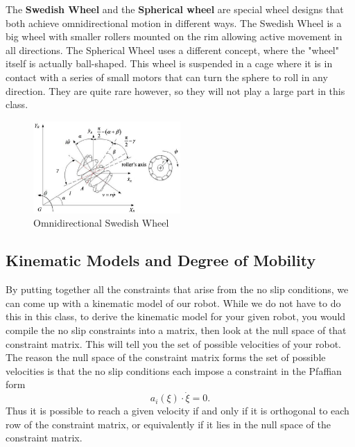\documentclass[twoside]{article}
\begin{document}
The \textbf{Swedish Wheel} and the \textbf{Spherical wheel} are special wheel designs that both achieve omnidirectional motion in different ways. The Swedish Wheel is a big wheel with smaller rollers mounted on the rim allowing active movement in all directions\cite{sns}. The Spherical Wheel uses a different concept, where the "wheel" itself is actually ball-shaped. This wheel is suspended in a cage where it is in contact with a series of small motors that can turn the sphere to roll in any direction. They are quite rare however, so they will not play a large part in this class.

\begin{figure}[H]
\centering
\includegraphics[width=0.5\textwidth]{swedish}
\caption{Omnidirectional Swedish Wheel \cite{swed}}
\end{figure}

\subsection*{Kinematic Models and Degree of Mobility}

By putting together all the constraints that arise from the no slip conditions, we can come up with a kinematic model of our robot. While we do not have to do this in this class, to derive the kinematic model for your given robot, you would compile the no slip constraints into a matrix, then look at the null space of that constraint matrix. This will tell you the set of possible velocities of your robot. The reason the null space of the constraint matrix forms the set of possible velocities is that the no slip conditions each impose a constraint in the Pfaffian form $$a_i(\xi) \cdot \dot{\xi} = 0.$$ Thus it is possible to reach a given velocity if and only if it is orthogonal to each row of the constraint matrix, or equivalently if it lies in the null space of the constraint matrix.
\end{document}
